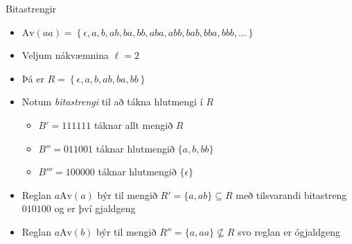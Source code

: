 \documentclass[icelandic]{beamer}
\newcommand{\Av}{\mathrm{Av}}
\begin{document}
\begin{frame}{Bitastrengir}
  \begin{itemize}[<+->]
    \item $\Av(aa) = \left\{ \epsilon, a, b, ab, ba, bb, aba, abb, bab, bba, bbb, \ldots \right\}$
    \item Veljum nákvæmnina $\ell = 2$
    \item Þá er $R = \left \{ \epsilon, a, b, ab, ba, bb \right \}$
    \item Notum \emph{bitastrengi} til að tákna hlutmengi í $R$
      \begin{itemize}
        \item $B' = 111111$ táknar allt mengið $R$
        \item $B'' = 011001$ táknar hlutmengið $\{a, b, bb\}$
        \item $B''' = 100000$ táknar hlutmengið $\{\epsilon\}$
      \end{itemize}
    \item Reglan $a \Av(a)$ býr til mengið $R' = \{ a, ab \} \subseteq R$ með tilsvarandi bitastreng $010100$ og er því gjaldgeng
    \item Reglan $a \Av(b)$ býr til mengið $R'' = \{ a, aa \} \not \subseteq R$ svo reglan er ógjaldgeng
  \end{itemize}
\end{frame}
\end{document}
